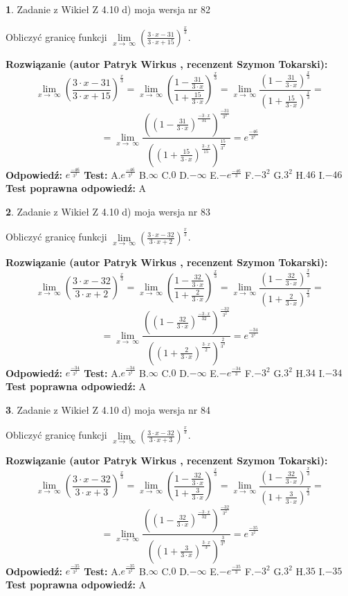 \documentclass[12pt, a4paper]{article}
\theoremstyle{definition} %
\newtheorem{zad}{}
\newcommand{\zadStart}[1]{\begin{zad}#1\newline}
\newcommand{\zadStop}{\end{zad}}
\newcommand{\rozwStart}[2]{\noindent \textbf{Rozwiązanie (autor #1 , recenzent #2): }\newline}
\newcommand{\rozwStop}{\newline}
\newcommand{\odpStart}{\noindent \textbf{Odpowiedź:}\newline}
\newcommand{\odpStop}{\newline}
\newcommand{\testStart}{\noindent \textbf{Test:}\newline}
\newcommand{\testStop}{\newline}
\newcommand{\kluczStart}{\noindent \textbf{Test poprawna odpowiedź:}\newline}
\newcommand{\kluczStop}{\newline}
\begin{document}
\zadStart{Zadanie z Wikieł Z 4.10 d) moja wersja nr 82}


Obliczyć granicę funkcji  $\lim\limits_{x\to\ \infty}(\frac{3\cdot x-31}{3\cdot x+15})^{\frac{x}{3}}$.
\zadStop
\rozwStart{Patryk Wirkus}{Szymon Tokarski}
$$\lim\limits_{x\to\ \infty}(\frac{3\cdot x-31}{3\cdot x+15})^{\frac{x}{3}} = \lim\limits_{x\to\ \infty}(\frac{1-\frac{31}{3\cdot x}}{1+\frac{15}{3\cdot x}})^{\frac{x}{3}}=\lim\limits_{x\to\ \infty}\frac{(1-\frac{31}{3\cdot x})^{\frac{x}{3}}}{(1+\frac{15}{3\cdot x})^{\frac{x}{3}}}=$$
$$=\lim\limits_{x\to\ \infty}\frac{((1-\frac{31}{3\cdot x})^{\frac{-3\cdot x}{31}})^{\frac{-31}{3^{2}}}}{((1+\frac{15}{3\cdot x})^{\frac{3\cdot x}{15}})^{\frac{15}{3^{2}}}}=e^{\frac{-46}{3^{2}}}$$
\rozwStop
\odpStart
$e^{\frac{-46}{3^{2}}}$
\odpStop
\testStart
A.$e^{\frac{-46}{3^{2}}}$ B.$\infty$ C.$0$ D.$-\infty$ E.$-e^{\frac{-46}{3}}$
F.$-3^{2}$ G.$3^{2}$
H.$46$
I.$-46$
\testStop
\kluczStart
A
\kluczStop



\zadStart{Zadanie z Wikieł Z 4.10 d) moja wersja nr 83}


Obliczyć granicę funkcji  $\lim\limits_{x\to\ \infty}(\frac{3\cdot x-32}{3\cdot x+2})^{\frac{x}{3}}$.
\zadStop
\rozwStart{Patryk Wirkus}{Szymon Tokarski}
$$\lim\limits_{x\to\ \infty}(\frac{3\cdot x-32}{3\cdot x+2})^{\frac{x}{3}} = \lim\limits_{x\to\ \infty}(\frac{1-\frac{32}{3\cdot x}}{1+\frac{2}{3\cdot x}})^{\frac{x}{3}}=\lim\limits_{x\to\ \infty}\frac{(1-\frac{32}{3\cdot x})^{\frac{x}{3}}}{(1+\frac{2}{3\cdot x})^{\frac{x}{3}}}=$$
$$=\lim\limits_{x\to\ \infty}\frac{((1-\frac{32}{3\cdot x})^{\frac{-3\cdot x}{32}})^{\frac{-32}{3^{2}}}}{((1+\frac{2}{3\cdot x})^{\frac{3\cdot x}{2}})^{\frac{2}{3^{2}}}}=e^{\frac{-34}{3^{2}}}$$
\rozwStop
\odpStart
$e^{\frac{-34}{3^{2}}}$
\odpStop
\testStart
A.$e^{\frac{-34}{3^{2}}}$ B.$\infty$ C.$0$ D.$-\infty$ E.$-e^{\frac{-34}{3}}$
F.$-3^{2}$ G.$3^{2}$
H.$34$
I.$-34$
\testStop
\kluczStart
A
\kluczStop



\zadStart{Zadanie z Wikieł Z 4.10 d) moja wersja nr 84}


Obliczyć granicę funkcji  $\lim\limits_{x\to\ \infty}(\frac{3\cdot x-32}{3\cdot x+3})^{\frac{x}{3}}$.
\zadStop
\rozwStart{Patryk Wirkus}{Szymon Tokarski}
$$\lim\limits_{x\to\ \infty}(\frac{3\cdot x-32}{3\cdot x+3})^{\frac{x}{3}} = \lim\limits_{x\to\ \infty}(\frac{1-\frac{32}{3\cdot x}}{1+\frac{3}{3\cdot x}})^{\frac{x}{3}}=\lim\limits_{x\to\ \infty}\frac{(1-\frac{32}{3\cdot x})^{\frac{x}{3}}}{(1+\frac{3}{3\cdot x})^{\frac{x}{3}}}=$$
$$=\lim\limits_{x\to\ \infty}\frac{((1-\frac{32}{3\cdot x})^{\frac{-3\cdot x}{32}})^{\frac{-32}{3^{2}}}}{((1+\frac{3}{3\cdot x})^{\frac{3\cdot x}{3}})^{\frac{3}{3^{2}}}}=e^{\frac{-35}{3^{2}}}$$
\rozwStop
\odpStart
$e^{\frac{-35}{3^{2}}}$
\odpStop
\testStart
A.$e^{\frac{-35}{3^{2}}}$ B.$\infty$ C.$0$ D.$-\infty$ E.$-e^{\frac{-35}{3}}$
F.$-3^{2}$ G.$3^{2}$
H.$35$
I.$-35$
\testStop
\kluczStart
A
\kluczStop
\end{document}
